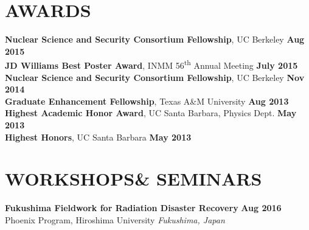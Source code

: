 \documentclass[margin, 10pt]{style/res} %
\begin{document}
\begin{resume}

\section{\small{AWARDS}}

{\bf Nuclear Science and Security Consortium Fellowship}, UC Berkeley \hfill {\bf Aug 2015}\\
{\bf JD Williams Best Poster Award}, INMM 56\textsuperscript{th} Annual Meeting \hfill {\bf July 2015}\\
{\bf Nuclear Science and Security Consortium Fellowship}, UC Berkeley \hfill {\bf Nov 2014}\\
{\bf Graduate Enhancement Fellowship}, Texas A\&M University \hfill {\bf Aug 2013}\\
{\bf Highest Academic Honor Award}, UC Santa Barbara, Physics Dept. \hfill {\bf May 2013}\\
{\bf Highest Honors}, UC Santa Barbara \hfill {\bf May 2013}






\section{\small{WORKSHOPS\newline \& SEMINARS}}


{\bf Fukushima Fieldwork for Radiation Disaster Recovery} \hfill {\bf Aug 2016}\\
{\small{Phoenix Program, Hiroshima University}} \hfill {\sl Fukushima, Japan}\\[-3.5ex]


\end{resume}
\end{document}

